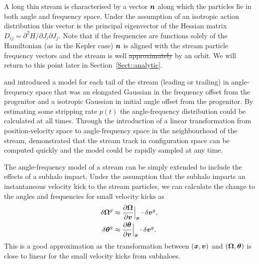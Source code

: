 \documentclass[useAMS,usenatbib,fleqn,a4paper]{mn2e}
\newcommand{\bs}[1]{\bmath{#1}}
\providecommand{\DIFaddtex}[1]{{\protect\color{blue}\uwave{#1}}} %
\providecommand{\DIFdeltex}[1]{{\protect\color{red}\sout{#1}}}                      %
\providecommand{\DIFaddbegin}{} %
\providecommand{\DIFaddend}{} %
\providecommand{\DIFdelbegin}{} %
\providecommand{\DIFdelend}{} %
\providecommand{\DIFadd}[1]{\texorpdfstring{\DIFaddtex{#1}}{#1}} %
\providecommand{\DIFdel}[1]{\texorpdfstring{\DIFdeltex{#1}}{}} %
\begin{document}
A long thin stream is characterised by a vector $\bs{n}$ along which the particles lie in both angle and frequency space. Under the assumption of an isotropic action distribution this vector is the principal eigenvector of the Hessian matrix $D_{ij}=\partial^2 H/\partial J_i\partial J_j$. Note that if the frequencies are functions solely of the Hamiltonian (as in the Kepler case) $\bs{n}$ is aligned with the stream particle frequency vectors and the stream is well \DIFdelbegin \DIFdel{approximately }\DIFdelend \DIFaddbegin \DIFadd{approximated }\DIFaddend by an orbit. We will return to this point later in Section~\ref{Sect::analytic}.
\DIFaddbegin 

\DIFaddend \cite{Bovy2014} and \cite{Sanders2014} introduced a model for each tail of the stream (leading or trailing) in angle-frequency space that was an elongated Gaussian in the frequency offset from the progenitor and a isotropic Gaussian in initial angle offset from the progenitor. By estimating some stripping rate $p(t)$ the angle-frequency distribution could be calculated at all times. Through the introduction of a linear transformation from position-velocity space to angle-frequency space in the neighbourhood of the stream, \cite{Bovy2014} demonstrated that the stream track in configuration space can be computed quickly and the model could be rapidly sampled at any time.

The angle-frequency model of a stream can be simply extended to include the effects of a subhalo impact. Under the assumption that the subhalo imparts an instantaneous velocity kick to the stream particles, we can calculate the change to the angles and frequencies for small velocity kicks as
\begin{equation}\label{eq:kickfreqangle}
\begin{split}
\delta \boldsymbol{\Omega}^g &\approx \frac{\upartial \boldsymbol{\Omega}}{\upartial \bs{v}}\Big|_{\bs{x}}\cdot \delta\bs{v}^g,\\
\delta \bs{\theta}^g &\approx \frac{\upartial \bs{\theta}}{\upartial \bs{v}}\Big|_{\bs{x}}\cdot \delta\bs{v}^g.
\end{split}
\end{equation}
This is a good approximation as the transformation between $(\bs{x},\bs{v})$ and $(\boldsymbol{\Omega},\bs{\theta})$ is close to linear for the small velocity kicks from subhaloes.
\end{document}

